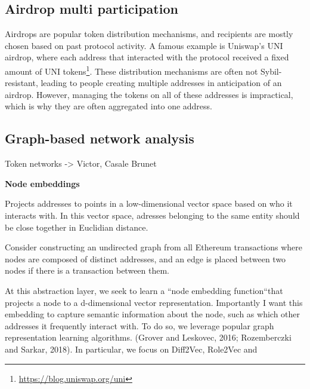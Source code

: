 \documentclass[12pt,a4paper,titlepage,oneside,english]{article}
\begin{document}
\subsection{Airdrop multi participation}
Airdrops are popular token distribution mechanisms, and recipients are mostly chosen based on past protocol activity. A famous example is Uniswap's UNI airdrop, where each address that interacted with the protocol received a fixed amount of UNI tokens\footnote{\url{https://blog.uniswap.org/uni}}. These distribution mechanisms are often not Sybil-resistant, leading to people creating multiple addresses in anticipation of an airdrop. However, managing the tokens on all of these addresses is impractical, which is why they are often aggregated into one address. \citep{FV:17}

\subsection{Graph-based network analysis}
Token networks -> Victor, Casale Brunet

\textbf{Node embeddings}

Projects addresses to points in a low-dimensional vector space based on who it interacts with. In this vector space, adresses belonging to the same entity should be close together in Euclidian distance.

Consider constructing an undirected graph from all Ethereum transactions where nodes are composed of distinct addresses, and an edge is placed between two nodes if there is a transaction between them.

At this abstraction layer, we seek to learn a ``node embedding function``that projects a node to a d-dimensional vector representation. Importantly I want this embedding to capture semantic information about the node, such as which other addresses it frequently interact with. To do so, we leverage popular graph representation learning algorithms. (Grover and Leskovec, 2016; Rozemberczki and Sarkar, 2018). In particular, we focus on Diff2Vec, Role2Vec and 
\end{document}
